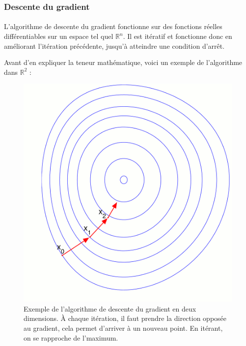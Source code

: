 \documentclass[a4paper, 11pt]{article}
\begin{document}
\subsubsection{Descente du gradient}
\paragraph{}
L'algorithme de descente du gradient fonctionne sur des fonctions réelles différentiables sur un espace tel quel $\mathbb{R}^n$. Il est itératif et fonctionne donc en améliorant l'itération précédente, jusqu'à atteindre une condition d'arrêt.

Avant d'en expliquer la teneur mathématique, voici un exemple de l'algorithme dans $\mathbb{R}^2$ :

\begin{figure}[H]
\centering
\includegraphics[scale=0.40]{images/descente_gradient_exemple}
\caption[]{Exemple de l'algorithme de descente du gradient en deux dimensions. À chaque itération, il faut prendre la direction opposée au gradient\footnotemark, cela permet d'arriver à un nouveau point. En itérant, on se rapproche de l'maximum. }
\end{figure}

\end{document}
